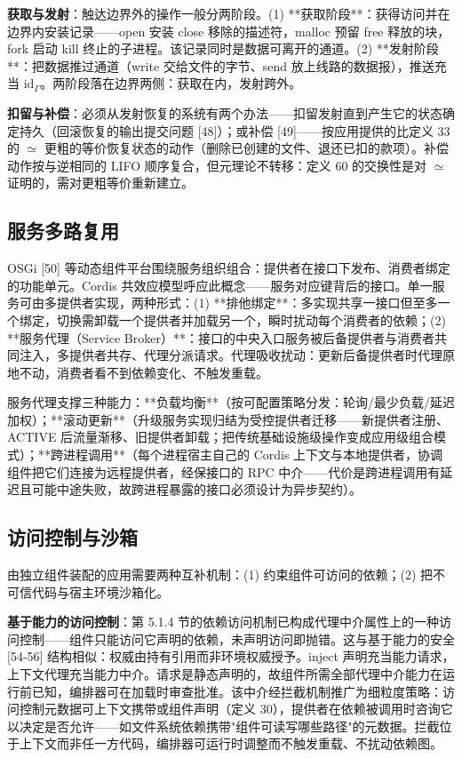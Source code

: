 \documentclass[11pt,a4paper]{article}
\theoremstyle{plain}
\theoremstyle{definition}
\theoremstyle{remark}
\begin{document}
\textbf{获取与发射}：触达边界外的操作一般分两阶段。(1) **获取阶段**：获得访问并在边界内安装记录——open 安装 close 移除的描述符，malloc 预留 free 释放的块，fork 启动 kill 终止的子进程。该记录同时是数据可离开的通道。(2) **发射阶段**：把数据推过通道（write 交给文件的字节、send 放上线路的数据报），推送充当 $\mathrm{id}_\Gamma$。两阶段落在边界两侧：获取在内，发射跨外。

\textbf{扣留与补偿}：必须从发射恢复的系统有两个办法——扣留发射直到产生它的状态确定持久（回滚恢复的输出提交问题 [48]）；或补偿 [49]——按应用提供的比定义 33 的 $\simeq$ 更粗的等价恢复状态的动作（删除已创建的文件、退还已扣的款项）。补偿动作按与逆相同的 LIFO 顺序复合，但元理论不转移：定义 60 的交换性是对 $\simeq$ 证明的，需对更粗等价重新建立。

\subsection{服务多路复用}

OSGi [50] 等动态组件平台围绕服务组织组合：提供者在接口下发布、消费者绑定的功能单元。Cordis 共效应模型呼应此概念——服务对应键背后的接口。单一服务可由多提供者实现，两种形式：(1) **排他绑定**：多实现共享一接口但至多一个绑定，切换需卸载一个提供者并加载另一个，瞬时扰动每个消费者的依赖；(2) **服务代理（Service Broker）**：接口的中央入口服务被后备提供者与消费者共同注入，多提供者共存、代理分派请求。代理吸收扰动：更新后备提供者时代理原地不动，消费者看不到依赖变化、不触发重载。

服务代理支撑三种能力：**负载均衡**（按可配置策略分发：轮询/最少负载/延迟加权）；**滚动更新**（升级服务实现归结为受控提供者迁移——新提供者注册、ACTIVE 后流量渐移、旧提供者卸载；把传统基础设施级操作变成应用级组合模式）；**跨进程调用**（每个进程宿主自己的 Cordis 上下文与本地提供者，协调组件把它们连接为远程提供者，经保接口的 RPC 中介——代价是跨进程调用有延迟且可能中途失败，故跨进程暴露的接口必须设计为异步契约）。

\subsection{访问控制与沙箱}

由独立组件装配的应用需要两种互补机制：(1) 约束组件可访问的依赖；(2) 把不可信代码与宿主环境沙箱化。

\textbf{基于能力的访问控制}：第 5.1.4 节的依赖访问机制已构成代理中介属性上的一种访问控制——组件只能访问它声明的依赖，未声明访问即抛错。这与基于能力的安全 [54-56] 结构相似：权威由持有引用而非环境权威授予。inject 声明充当能力请求，上下文代理充当能力中介。请求是静态声明的，故组件所需全部代理中介能力在运行前已知，编排器可在加载时审查批准。该中介经拦截机制推广为细粒度策略：访问控制元数据可上下文携带或组件声明（定义 30），提供者在依赖被调用时咨询它以决定是否允许——如文件系统依赖携带"组件可读写哪些路径"的元数据。拦截位于上下文而非任一方代码，编排器可运行时调整而不触发重载、不扰动依赖图。
\end{document}

